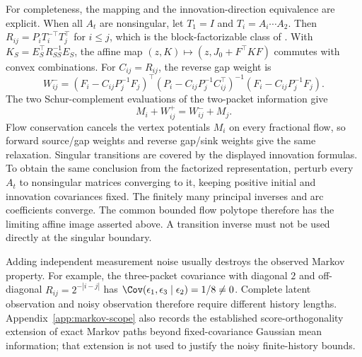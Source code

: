 For completeness, the mapping and the innovation-direction equivalence are
explicit. When all $A_t$ are nonsingular, let $T_1=I$ and
$T_i=A_i\cdots A_2$. Then
$R_{ij}=P_iT_i^{-\top}T_j^\top$ for $i\le j$, which is the block-factorizable
class of \citet{Lee2026}. With
$K_S=E_S^\top R_{SS}^{-1}E_S$, the affine map
$(z,K)\mapsto(z,J_0+F^\top KF)$ commutes with convex combinations.
For $C_{ij}=R_{ij}$, the reverse gap weight is
\[
 W^-_{ij}=(F_i-C_{ij}P_j^{-1}F_j)^\top
 (P_i-C_{ij}P_j^{-1}C_{ij}^\top)^{-1}
 (F_i-C_{ij}P_j^{-1}F_j).
\]
The two Schur-complement evaluations of the two-packet information give
\begin{equation}
 M_i+W^+_{ij}=W^-_{ij}+M_j.
 \label{eq:forward-reverse}
\end{equation}
Flow conservation cancels the vertex potentials $M_i$ on every fractional
flow, so forward source/gap weights and reverse gap/sink weights give the
same relaxation. Singular transitions are covered by the displayed innovation
formulas. To obtain the same conclusion from the factorized representation,
perturb every $A_t$ to nonsingular matrices converging to it, keeping positive
initial and innovation covariances fixed. The finitely many principal
inverses and arc coefficients converge. The common bounded flow polytope
therefore has the limiting affine image asserted above. A transition inverse
must not be used directly at the singular boundary.

Adding independent measurement noise usually destroys the observed Markov
property. For example, the three-packet covariance with diagonal $2$ and
off-diagonal $R_{ij}=2^{-|i-j|}$ has
$\Cov(\epsilon_1,\epsilon_3\mid\epsilon_2)=1/8\ne0$.
Complete latent observation and noisy observation therefore require different
history lengths. Appendix~\ref{app:markov-scope} also records the established
score-orthogonality extension of exact Markov paths beyond fixed-covariance
Gaussian mean information; that extension is not used to justify the noisy
finite-history bounds.


